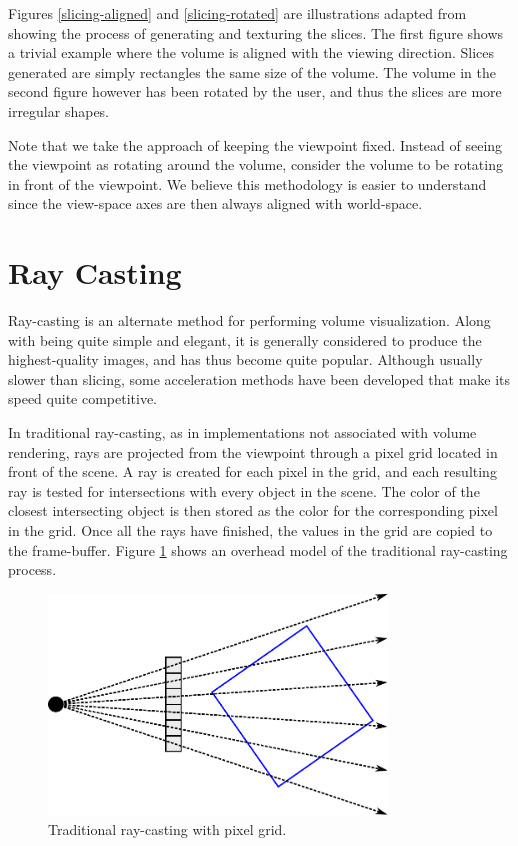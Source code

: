 \documentclass{article}
\begin{document}
Figures \ref{slicing-aligned} and \ref{slicing-rotated} are illustrations
adapted from \cite{Ikits04} showing the process of generating and texturing the
slices.  The first figure shows a trivial example where the volume is aligned
with the viewing direction.  Slices generated are simply rectangles the same
size of the volume.  The volume in the second figure however has been rotated by
the user, and thus the slices are more irregular shapes.

Note that we take the approach of keeping the viewpoint fixed.  Instead of
seeing the viewpoint as rotating around the volume, consider the volume to be
rotating in front of the viewpoint.  We believe this methodology is easier to
understand since the view-space axes are then always aligned with world-space.

\section{Ray Casting}

Ray-casting is an alternate method for performing volume visualization.  Along
with being quite simple and elegant, it is generally considered to produce the
highest-quality images, and has thus become quite popular.  Although usually
slower than slicing, some acceleration methods have been developed that make its
speed quite competitive.

In traditional ray-casting, as in implementations not associated with volume
rendering, rays are projected from the viewpoint through a pixel grid located in
front of the scene.  A ray is created for each pixel in the grid, and each
resulting ray is tested for intersections with every object in the scene.  The
color of the closest intersecting object is then stored as the color for the
corresponding pixel in the grid.  Once all the rays have finished, the values in
the grid are copied to the frame-buffer.  Figure \ref{traditional-ray-casting}
shows an overhead model of the traditional ray-casting process.

\begin{figure}
\centering
\includegraphics[width=0.8\textwidth]{traditional-ray-casting.pdf}
\caption{Traditional ray-casting with pixel grid.}
\label{traditional-ray-casting}
\end{figure}
\end{document}
